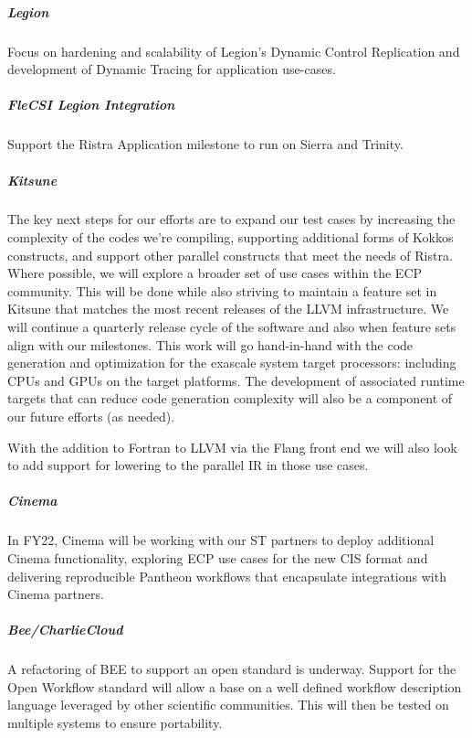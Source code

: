 \subparagraph{Legion} 
Focus on hardening and scalability of Legion's Dynamic Control Replication and development of Dynamic Tracing for application use-cases. 

\subparagraph{FleCSI Legion Integration} 
Support the Ristra Application milestone to run on Sierra and Trinity.

\subparagraph{Kitsune}
The key next steps for our efforts are to expand our test cases by
increasing the complexity of the codes we're compiling, supporting
additional forms of Kokkos constructs, and support other parallel
constructs that meet the needs of Ristra.  Where possible, we will
explore a broader set of use cases within the ECP community.  This
will be done while also striving to maintain a feature set in Kitsune
that matches the most recent releases of the LLVM infrastructure. We
will continue a quarterly release cycle of the software and also when
feature sets align with our milestones.  This work will go
hand-in-hand with the code generation and optimization for the
exascale system target processors: including CPUs and GPUs on the
target platforms.  The development of associated runtime targets that
can reduce code generation complexity will also be a component of our
future efforts (as needed).

With the addition to Fortran to LLVM via the Flang front end we will
also look to add support for lowering to the parallel IR in those
use cases.

\subparagraph{Cinema}
In FY22, Cinema will be working with our ST partners to deploy additional Cinema functionality, exploring ECP use cases for the new CIS format and delivering reproducible Pantheon workflows that encapsulate integrations with Cinema partners.  


\subparagraph{Bee/CharlieCloud}
A refactoring of BEE to support an open standard is underway. Support for the Open Workflow standard will allow a base on a well defined workflow description language leveraged by other scientific communities. This will then be tested on multiple systems to ensure portability.
